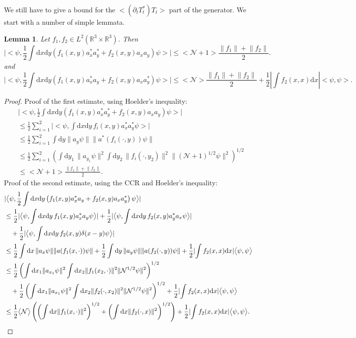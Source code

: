 \documentclass[11pt,a4paper]{scrartcl}
\newtheorem{lem}[thm]{Lemma}
\newcommand{\di}{\textrm{d}}		%
\newcommand{\Ncal}{\mathcal{N}}		%
\newcommand{\scal}[2]{\big<#1,#2\big>} %
\newcommand{\Rbb}{\mathbb{R}}		%
\newcommand{\norm}[1]{\lVert#1\rVert}	%
\newcommand{\ev}[1]{\big<#1\big>}	%
\newcommand{\bd}{\begin{displaymath}}			%
\newcommand{\ed}{\end{displaymath}}
\begin{document}
We still have to give a bound for the $\ev{(\partial_t T^*_t)T_t}$ part of the generator. We start with a number of simple lemmata.
\begin{lem}
\label{lm:Bbound}
Let $f_1, f_2 \in L^2(\Rbb^3\times \Rbb^3)$. Then
 \bd
\lvert \scal{\psi}{\frac{1}{2} \int \di x\di y \left( f_1(x,y) a^\ast_x a^\ast_y + f_2(x,y) a_x a_y \right) \psi} \rvert \leq \ev{\Ncal+1} \frac{\norm{f_1}+\norm{f_2}}{2}.
\ed
and
 \bd
\lvert \scal{\psi}{\frac{1}{2} \int \di x\di y \left( f_1(x,y) a^\ast_x a_y + f_2(x,y) a_x a^\ast_y \right)  \psi} \rvert \leq \ev{\Ncal} \frac{\norm{f_1}+\norm{f_2}}{2} + \frac{1}{2} \left\lvert \int f_2(x,x) \di x \right\rvert \scal{\psi}{\psi}.
\ed
\end{lem}
\begin{proof} Proof of the first estimate, using Hoelder's inequality:
 \begin{align*}
  & \lvert \scal{\psi}{\frac{1}{2} \int \di x\di y \left( f_1(x,y) a^\ast_x a^\ast_y + f_2(x,y) a_x a_y \right) \psi} \rvert \\
& \leq \frac{1}{2} \sum_{i=1}^2 \lvert \scal{\psi}{\int \di x\di y\, f_i(x,y) a^\ast_x a^\ast_y \psi }\rvert \\
& \leq \frac{1}{2} \sum_{i=1}^2 \int \di y \norm{a_y \psi} \norm{a^\ast(f_i(\cdot,y))\psi} \\
& \leq \frac{1}{2} \sum_{i=1}^2 \left( \int \di y_1\, \norm{a_{y_1}\psi}^2 \int \di y_2\, \norm{f_i(\cdot,y_2)}^2 \norm{(\Ncal+1)^{1/2} \psi}^2 \right)^{1/2} \\
& \leq \ev{\Ncal+1} \frac{\norm{f_1}+\norm{f_2}}{2}.
 \end{align*}
Proof of the second estimate, using the CCR and Hoelder's inequality:
 \begin{align*}
& \lvert \scal{\psi}{\frac{1}{2} \int \di x\di y \left( f_1(x,y) a^\ast_x a_y + f_2(x,y) a_x a^\ast_y \right)  \psi} \rvert\\
& \leq \frac{1}{2} \lvert \scal{\psi}{\int \di x\di y\, f_1(x,y) a^\ast_x a_y \psi} \rvert + \frac{1}{2}\lvert \scal{\psi}{\int \di x \di y\, f_2(x,y) a^\ast_y a_x \psi}\rvert \\
&\quad + \frac{1}{2} \lvert \scal{\psi}{\int \di x \di y\, f_2(x,y) \delta(x-y) \psi}\rvert \\
& \leq \frac{1}{2} \int \di x\, \norm{a_x \psi} \norm{a(f_1(x,\cdot))\psi} + \frac{1}{2} \int \di y\, \norm{a_y\psi} \norm{a(f_2(\cdot,y))\psi} + \frac{1}{2} \lvert \int f_2(x,x) \di x \rvert \scal{\psi}{\psi} \\
& \leq \frac{1}{2} \left( \int \di x_1 \norm{a_{x_1}\psi}^2 \int \di x_2 \norm{f_1(x_2,\cdot)}^2 \norm{\Ncal^{1/2}\psi}^2 \right)^{1/2}\\
& \quad + \frac{1}{2} \left( \int \di x_1 \norm{a_{x_1}\psi}^2 \int \di x_2 \norm{f_2(\cdot,x_2)}^2 \norm{\Ncal^{1/2}\psi}^2 \right)^{1/2} + \frac{1}{2}\lvert \int f_2(x,x) \di x\rvert \scal{\psi}{\psi} \\
& \leq \frac{1}{2}\ev{\Ncal} \left(\left(\int \di x \norm{f_1(x,\cdot)}^2 \right)^{1/2} + \left(\int \di x \norm{f_2(\cdot,x)}^2 \right)^{1/2} \right) + \frac{1}{2}\lvert \int f_2(x,x) \di x\rvert \scal{\psi}{\psi}. 	\qedhere
 \end{align*}
\end{proof}
\end{document}
